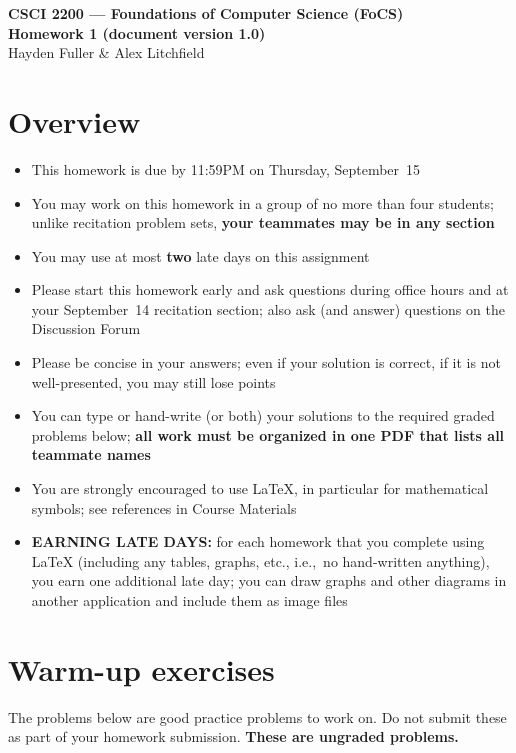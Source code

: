 \documentclass[11pt]{article}
\begin{document}
\thispagestyle{empty}   %

\begin{center}
\large
\textbf{CSCI 2200 --- Foundations of Computer Science (FoCS) \\
Homework 1 (document version 1.0)}
\\Hayden Fuller \& Alex Litchfield
\end{center}

\section*{Overview}
\begin{itemize}
\item This homework is due by 11:59PM on Thursday, September~15
\item You may work on this homework in a group of no more than four students;
  unlike recitation problem sets,
  \textbf{your teammates may be in any section}
\item You may use at most \textbf{two} late days on this assignment
\item Please start this homework early and ask questions during
  office hours and at your September~14 recitation section;
  also ask (and answer) questions on the Discussion Forum 
\item Please be concise in your answers;
  even if your solution is correct, if it is not well-presented,
  you may still lose points
\item You can type or hand-write (or both) your solutions
  to the required graded problems below;
  \textbf{all work must be organized in one PDF that lists
  all teammate names}
\item You are strongly encouraged to use LaTeX, in particular for
  mathematical symbols;
  see references in Course Materials
\item \textbf{EARNING LATE DAYS:}
  for each homework that you complete using LaTeX
  (including any tables, graphs, etc., i.e.,~no hand-written anything),
  you earn one additional late day;
  you can draw graphs and other diagrams
  in another application and include them as image files
\end{itemize}

\vspace{0.2in}

\newpage
\section*{Warm-up exercises}
The problems below are good practice problems to work on.
Do not submit these as part of your homework submission.
\textbf{These are ungraded problems.}
\end{document}
